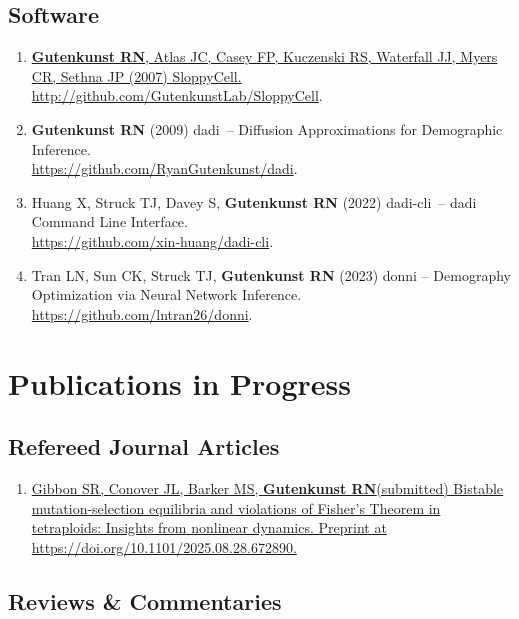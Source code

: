 \documentclass[11pt]{article}
\newcommand{\dadi}{dadi\xspace}
\begin{document}
\subsection*{Software}
\begin{enumerate}

\item \href{http://github.com/GutenkunstLab/SloppyCell}{\grad \textbf{Gutenkunst RN}, Atlas JC, Casey FP, Kuczenski RS, Waterfall JJ, Myers CR, Sethna JP (2007) 
SloppyCell.} \url{http://github.com/GutenkunstLab/SloppyCell}.

\item\textbf{Gutenkunst RN} (2009)
\dadi\ -- Diffusion Approximations for Demographic Inference. \\ \url{https://github.com/RyanGutenkunst/dadi}.

\item Huang X\trainee, Struck TJ\trainee, Davey S, \textbf{Gutenkunst RN} (2022) dadi-cli\ -- dadi Command Line Interface.\\ \url{https://github.com/xin-huang/dadi-cli}.

\item Tran LN\trainee, Sun CK\trainee, Struck TJ\trainee, \textbf{Gutenkunst RN} (2023) donni -- Demography Optimization via Neural Network Inference. \url{https://github.com/lntran26/donni}.

\end{enumerate}


\section*{Publications in Progress}
\subsection*{Refereed Journal Articles}
\begin{enumerate}


\item \href{https://doi.org/10.1101/2025.08.28.672890}{Gibbon SR\trainee, Conover JL\trainee\corresponding, Barker MS, \textbf{Gutenkunst RN}\corresponding (submitted) Bistable mutation-selection equilibria and violations of Fisher’s Theorem in tetraploids: Insights from nonlinear dynamics. Preprint at https://doi.org/10.1101/2025.08.28.672890.}

\end{enumerate}

\subsection*{Reviews \& Commentaries}
\end{document}
